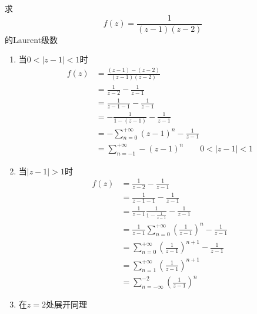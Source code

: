 \begin{homeworkProblem}
    求\[f(z)=\frac{1}{(z-1)(z-2)}\]的Laurent级数\newline
\solution
\begin{enumerate}
    \item 当$0<|z-1|<1$时
    \[\begin{split}
    f(z) &= \frac{(z-1) - (z-2)}{(z-1)(z-2)}\\
    &= \frac{1}{z-2} - \frac{1}{z-1} \\
    &= \frac{1}{z-1 -1} - \frac{1}{z-1} \\
    &= -\frac{1}{1-(z-1)}- \frac{1}{z-1}\\
    &= -\sum_{n=0}^{+\infty}(z-1)^n - \frac{1}{z-1}\\
    &= \sum_{n=-1}^{+\infty}-(z-1)^n \qquad 0<|z-1|<1
    \end{split}\]
    \item 当$|z-1| > 1$时
    \[\begin{split}
    f(z) &= \frac{1}{z-2} - \frac{1}{z-1}\\
    &= \frac{1}{z-1 - 1}- \frac{1}{z-1}\\
    &= \frac{1}{z-1}\frac{1}{1-\frac{1}{z-1}}- \frac{1}{z-1}\\
    &= \frac{1}{z-1}\sum_{n=0}^{+\infty}(\frac{1}{z-1})^n - \frac{1}{z-1}\\
    &=\sum_{n=0}^{+\infty}(\frac{1}{z-1})^{n+1} - \frac{1}{z-1}\\
    &=\sum_{n=1}^{+\infty}(\frac{1}{z-1})^{n+1}\\
    &= \sum_{n=-\infty}^{-2}(\frac{1}{z-1})^{n}
    \end{split}\]
    \item 在$z=2$处展开同理
\end{enumerate}
\end{homeworkProblem}
\newpage
